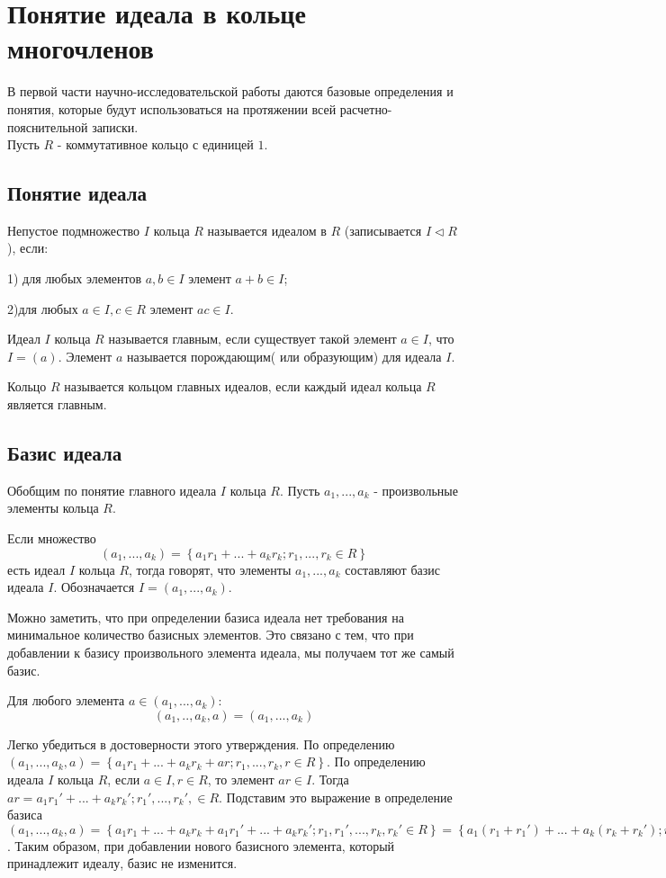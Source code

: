 \section{Понятие идеала в кольце многочленов}
\label{cha:basedifinition}

В первой части научно-исследовательской работы даются базовые определения и понятия, которые будут использоваться на протяжении всей расчетно-пояснительной записки.
\\Пусть $R$ - коммутативное кольцо с единицей $1$.


\subsection{Понятие идеала}

Непустое подмножество $I$ кольца $R$ называется идеалом в $R$ (записывается $I \triangleleft R$), если:

1) для любых элементов $a,b \in I$ элемент $a + b \in I$;

2)для любых $a \in I, c \in R$ элемент $ac \in I$.

Идеал $I$ кольца $R$ называется главным, если существует такой элемент $a \in I$, что $ I = (a)$. Элемент $a$ называется порождающим( или образующим)  для идеала $I$.

Кольцо  $R$ называется кольцом главных идеалов, если каждый идеал кольца $R$ является главным.

\subsection{Базис идеала}

Обобщим по понятие главного идеала $I$ кольца $R$.  Пусть 
$a_{1}, ... , a_{k}$ - произвольные элементы кольца $R$.

Если множество 
$$ (a_{1}, ... , a_{k}) =\left\{ a_{1}r_{1} + ... + a_{k}r_{k};  r_{1}, ... , r_{k} \in R \right\} $$ есть идеал $I$ кольца $R$, тогда говорят, что элементы $a_{1}, ... , a_{k}$ составляют базис идеала $I$. Обозначается  $I = (a_{1}, ... , a_{k})$.

Можно заметить, что при определении базиса идеала нет требования на минимальное количество базисных элементов. Это связано с тем, что при добавлении к базису произвольного элемента идеала, мы получаем тот же самый базис.

Для любого элемента $a \in (a_{1}, ..., a_{k})$:
$$ (a_{1}, .. , a_{k}, a) = (a_{1}, ... ,a_{k}) $$ 

Легко убедиться в достоверности этого утверждения. По определению $ (a_{1}, ... , a_{k}, a) = \left\{ a_{1}r_{1} + ... + a_{k}r_{k} + ar;   r_{1}, ... , r_{k}, r \in R \right\} $. По определению идеала $I$ кольца $R$, если $a \in I, r \in R$, то элемент $ar \in I$. Тогда 
$ar = a_{1}r_{1}' + ... + a_{k}r_{k}';  r_{1}', ... , r_{k}', \in R $. Подставим это выражение в определение базиса $ (a_{1}, ... , a_{k}, a) = \left\{ a_{1}r_{1} + ... + a_{k}r_{k} + a_{1}r_{1}' + ... + a_{k}r_{k}';  r_{1}, r_{1}', ... , r_{k},  r_{k}' \in R \right\} = 
 \left\{ a_{1}(r_{1} + r_{1}') + ... + a_{k}(r_{k} + r_{k}');  r_{1}, r_{1}', ... , r_{k}, r_{k}' \in R \right\} $. Таким образом, при добавлении нового базисного элемента, который принадлежит идеалу, базис не изменится.
 
